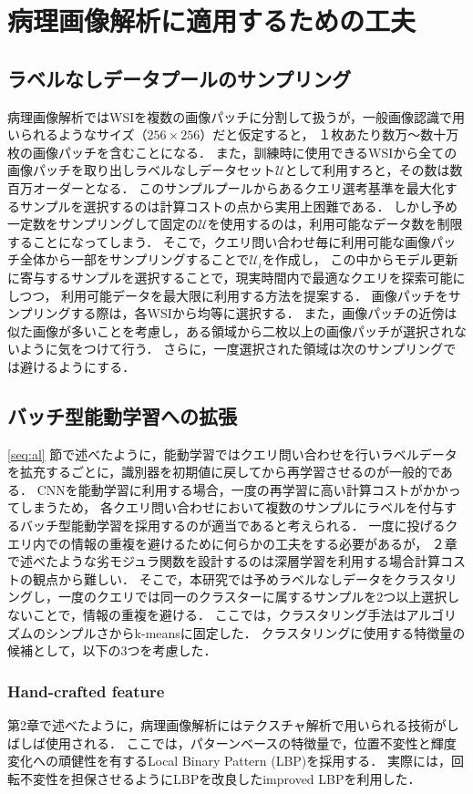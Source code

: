 \section{病理画像解析に適用するための工夫}
\subsection{ラベルなしデータプールのサンプリング}
病理画像解析ではWSIを複数の画像パッチに分割して扱うが，一般画像認識で用いられるようなサイズ（$256 \times 256$）だと仮定すると，
１枚あたり数万〜数十万枚の画像パッチを含むことになる．
また，訓練時に使用できるWSIから全ての画像パッチを取り出しラベルなしデータセット$\mathcal{U}$として利用すろと，その数は数百万オーダーとなる．
このサンプルプールからあるクエリ選考基準を最大化するサンプルを選択するのは計算コストの点から実用上困難である．
しかし予め一定数をサンプリングして固定の$\mathcal{U}$を使用するのは，利用可能なデータ数を制限することになってしまう．
そこで，クエリ問い合わせ毎に利用可能な画像パッチ全体から一部をサンプリングすることで$\mathcal{U}_i$を作成し，
この中からモデル更新に寄与するサンプルを選択することで，現実時間内で最適なクエリを探索可能にしつつ，
利用可能データを最大限に利用する方法を提案する．
画像パッチをサンプリングする際は，各WSIから均等に選択する．
また，画像パッチの近傍は似た画像が多いことを考慮し，ある領域から二枚以上の画像パッチが選択されないように気をつけて行う．
さらに，一度選択された領域は次のサンプリングでは避けるようにする．

\subsection{バッチ型能動学習への拡張}
\ref{seq:al} 節で述べたように，能動学習ではクエリ問い合わせを行いラベルデータを拡充するごとに，識別器を初期値に戻してから再学習させるのが一般的である．
CNNを能動学習に利用する場合，一度の再学習に高い計算コストがかかってしまうため，
各クエリ問い合わせにおいて複数のサンプルにラベルを付与するバッチ型能動学習を採用するのが適当であると考えられる．
一度に投げるクエリ内での情報の重複を避けるために何らかの工夫をする必要があるが，
２章で述べたような劣モジュラ関数を設計するのは深層学習を利用する場合計算コストの観点から難しい．
そこで，本研究では予めラベルなしデータをクラスタリングし，一度のクエリでは同一のクラスターに属するサンプルを2つ以上選択しないことで，情報の重複を避ける．
ここでは，クラスタリング手法はアルゴリズムのシンプルさからk-meansに固定した．
クラスタリングに使用する特徴量の候補として，以下の3つを考慮した．

\subsubsection{\textbf{Hand-crafted feature}}
第2章で述べたように，病理画像解析にはテクスチャ解析で用いられる技術がしばしば使用される．
ここでは，パターンベースの特徴量で，位置不変性と輝度変化への頑健性を有するLocal Binary Pattern (LBP)\cite{ojala2002multiresolution}を採用する．
実際には，回転不変性を担保させるようにLBPを改良したimproved LBPを利用した．

